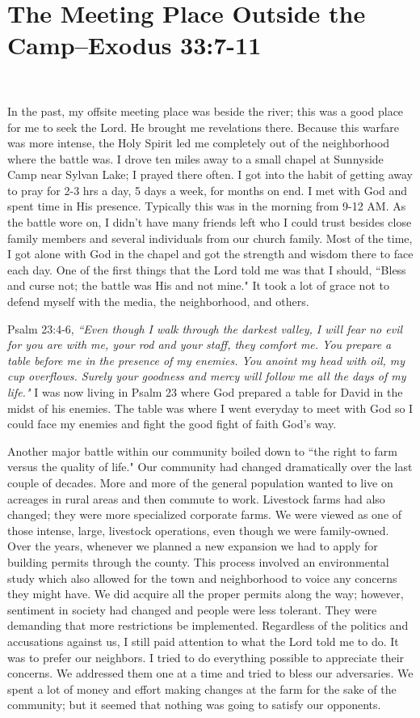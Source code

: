 \documentclass[oneside]{book}
\begin{document}
\section{The Meeting Place Outside the Camp--Exodus 33:7-11}
\

In the past, my offsite meeting place was beside the river; this was a good place for me to seek the Lord. He brought me revelations there. Because this warfare was more intense, the Holy Spirit led me completely out of the neighborhood where the battle was. I drove ten miles away to a small chapel at Sunnyside Camp near Sylvan Lake; I prayed there often. I got into the habit of getting away to pray for 2-3 hrs a day, 5 days a week, for months on end. I met with God and spent time in His presence. Typically this was in the morning from 9-12 AM. As the battle wore on, I didn't have many friends left who I could trust besides close family members and several individuals from our church family. Most of the time, I got alone with God in the chapel and got the strength and wisdom there to face each day. One of the first things that the Lord told me was that I should, ``Bless and curse not; the battle was His and not mine." It took a lot of grace not to defend myself with the media, the neighborhood, and others.


Psalm 23:4-6, \textit{``Even though I walk through the darkest valley, I will fear no evil for you are with me, your rod and your staff, they comfort me. You prepare a table before me in the presence of my enemies. You anoint my head with oil, my cup overflows. Surely your goodness and mercy will follow me all the days of my life."} I was now living in Psalm 23 where God prepared a table for David in the midst of his enemies. The table was where I went everyday to meet with God so I could face my enemies and fight the good fight of faith God's way.

Another major battle within our community boiled down to ``the right to farm versus the quality of life." Our community had changed dramatically over the last couple of decades. More and more of the general population wanted to live on acreages in rural areas and then commute to work. Livestock farms had also changed; they were more specialized corporate farms. We were viewed as one of those intense, large, livestock operations, even though we were family-owned. Over the years, whenever we planned a new expansion we had to apply for building permits through the county. This process involved an environmental study which also allowed for the town and neighborhood to voice any concerns they might have. We did acquire all the proper permits along the way; however, sentiment in society had changed and people were less tolerant. They were demanding that more restrictions be implemented. Regardless of the politics and accusations against us, I still paid attention to what the Lord told me to do. It was to prefer our neighbors. I tried to do everything possible to appreciate their concerns. We addressed them one at a time and tried to bless our adversaries. We spent a lot of money and effort making changes at the farm for the sake of the community; but it seemed that nothing was going to satisfy our opponents. 
\end{document}
